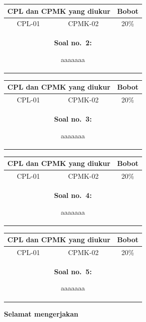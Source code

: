 \documentclass[11pt,a4paper]{article}
\newcommand{\soal}[5]{
\noindent
\begin{tabular}{|c|c|c|}
\hline
\multicolumn{2}{|c|}{\textbf{CPL dan CPMK yang diukur}} & \textbf{Bobot} \\
\hline
\begin{minipage}{0.425\linewidth}\centering #2\end{minipage} & \begin{minipage}{0.425\linewidth}\centering #3\end{minipage} & #4 \\
\hline
\multicolumn{3}{|c|}{\begin{minipage}{0.975\linewidth}\bigskip
\textbf{Soal no.\ #1:}

#5\smallskip
\end{minipage}}\\
\hline
\end{tabular}\medskip}
\begin{document}
\soal{2}{CPL-01}{CPMK-02}{20\%}{aaaaaaa}\medskip

\soal{3}{CPL-01}{CPMK-02}{20\%}{aaaaaaa}\medskip

\soal{4}{CPL-01}{CPMK-02}{20\%}{aaaaaaa}\medskip

\soal{5}{CPL-01}{CPMK-02}{20\%}{aaaaaaa}\bigskip
\begin{center}
\textbf{Selamat mengerjakan}
\end{center}
\end{document}
